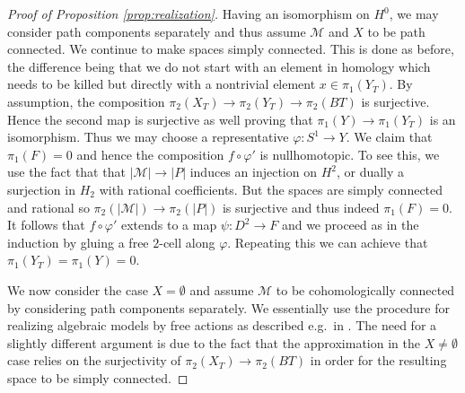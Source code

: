\documentclass[12pt,a4paper]{article}
\theoremstyle{definition}
\begin{document}
\begin{proof}[Proof of Proposition \ref{prop:realization}]
Having an isomorphism on $H^0$, we may consider path components separately and thus assume $\mathcal{M}$ and $X$ to be path connected.
We continue to make spaces simply connected. This is done as before, the difference being that we do not start with an element in homology which needs to be killed but directly with a nontrivial element $x\in\pi_1(Y_T)$.
By assumption, the composition $\pi_2(X_T)\rightarrow \pi_2(Y_T)\rightarrow \pi_2(BT)$ is surjective. Hence the second map is surjective as well proving that $\pi_1(Y)\rightarrow \pi_1(Y_T)$ is an isomorphism. Thus we may choose a representative $\varphi\colon S^1\rightarrow Y$.
We claim that $\pi_1(F)=0$ and hence the composition $f\circ\varphi'$ is nullhomotopic. To see this, we use the fact that that $\vert\mathcal{M}\vert\rightarrow\vert P\vert$ induces an injection on $H^2$, or dually a surjection in $H_2$ with rational coefficients. But the spaces are simply connected and rational so $\pi_2(\vert\mathcal{M}\vert)\rightarrow\pi_2(\vert P\vert)$ is surjective and thus indeed $\pi_1(F)=0$. It follows that $f\circ\varphi'$ extends to a map $\psi\colon D^2\rightarrow F$ and we proceed as in the induction by gluing a free $2$-cell along $\varphi$. Repeating this we can achieve that $\pi_1(Y_T)=\pi_1(Y)=0$.


We now consider the case $X=\emptyset$ and assume $\mathcal{M}$ to be cohomologically connected by considering path components separately. We essentially use the procedure for realizing algebraic models by free actions as described e.g.\ in \cite[Proposition 4.2]{HalperinTori}. The need for a slightly different argument is due to the fact that the approximation in the $X\neq \emptyset$ case relies on the surjectivity of $\pi_2(X_T)\rightarrow \pi_2(BT)$ in order for the resulting space to be simply connected.


\end{proof}
\end{document}
